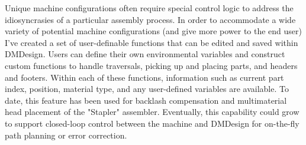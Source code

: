 {Unique machine configurations often require special control logic to address the idiosyncrasies of a particular assembly process.  In order to accommodate a wide variety of potential machine configurations (and give more power to the end user) I've created a set of user-definable functions that can be edited and saved within DMDesign.  Users can define their own environmental variables and construct custom functions to handle traversals, picking up and placing parts, and headers and footers.  Within each of these functions, information such as current part index, position, material type, and any user-defined variables are available.  To date, this feature has been used for backlash compensation and multimaterial head placement of the "Stapler" assembler.  Eventually, this capability could grow to support closed-loop control between the machine and DMDesign for on-the-fly path planning or error correction.\\

}
